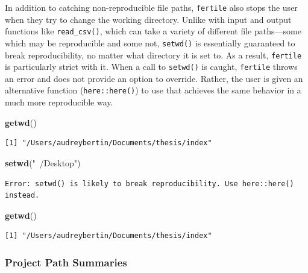 \documentclass[12pt,twoside]{reedthesis}
\newenvironment{Shaded}{\begin{snugshade}}{\end{snugshade}}
\newcommand{\KeywordTok}[1]{\textcolor[rgb]{0.13,0.29,0.53}{\textbf{#1}}}
\newcommand{\NormalTok}[1]{#1}
\newcommand{\StringTok}[1]{\textcolor[rgb]{0.31,0.60,0.02}{#1}}
\begin{document}
In addition to catching non-reproducible file paths, \texttt{fertile} also stops the user when they try to change the working directory. Unlike with input and output functions like \texttt{read\_csv()}, which can take a variety of different file paths---some which may be reproducible and some not, \texttt{setwd()} is essentially guaranteed to break reproducibility, no matter what directory it is set to. As a result, \texttt{fertile} is particularly strict with it. When a call to \texttt{setwd()} is caught, \texttt{fertile} throws an error and does not provide an option to override. Rather, the user is given an alternative function (\texttt{here::here()}) to use that achieves the same behavior in a much more reproducible way.
\begin{Shaded}
\begin{Highlighting}[]
\KeywordTok{getwd}\NormalTok{()}
\end{Highlighting}
\end{Shaded}
\begin{verbatim}
[1] "/Users/audreybertin/Documents/thesis/index"
\end{verbatim}
\begin{Shaded}
\begin{Highlighting}[]
\KeywordTok{setwd}\NormalTok{(}\StringTok{"~/Desktop"}\NormalTok{)}
\end{Highlighting}
\end{Shaded}
\begin{verbatim}
Error: setwd() is likely to break reproducibility. Use here::here() instead.
\end{verbatim}
\begin{Shaded}
\begin{Highlighting}[]
\KeywordTok{getwd}\NormalTok{()}
\end{Highlighting}
\end{Shaded}
\begin{verbatim}
[1] "/Users/audreybertin/Documents/thesis/index"
\end{verbatim}
\hypertarget{project-path-summaries}{%
\subsubsection{Project Path Summaries}\label{project-path-summaries}}
\end{document}
